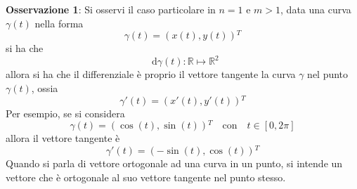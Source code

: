 \documentclass[a4paper]{extarticle}
\newcommand*\dif{\mathop{}\!\mathrm{d}}
\begin{document}
\vspace{2em}
\noindent
\textbf{Osservazione 1}: Si osservi il caso particolare in $n=1$ e $m>1$, data una curva $\gamma(t)$ nella forma
\[\gamma(t) = (x(t),y(t)){^T}\]
si ha che
\[\dif \gamma(t) : \mathbb{R} \longmapsto \mathbb{R}^2\]
allora si ha che il differenziale è proprio il vettore tangente la curva $\gamma$ nel punto $\gamma(t)$, ossia 
\[\gamma'(t) = \left(x'(t),y'(t)\right){^T}\]
Per esempio, se si considera
\[\gamma(t)=(\cos(t),\sin(t)){^T} \hspace{1em} \text{con} \hspace{1em} t \in [0,2\pi]\]
allora il vettore tangente è
\[\gamma'(t)=\left(-\sin(t),\cos(t)\right){^T}\]
Quando si parla di vettore ortogonale ad una curva in un punto, si intende un vettore che è ortogonale al suo vettore tangente nel punto stesso.
\end{document}
